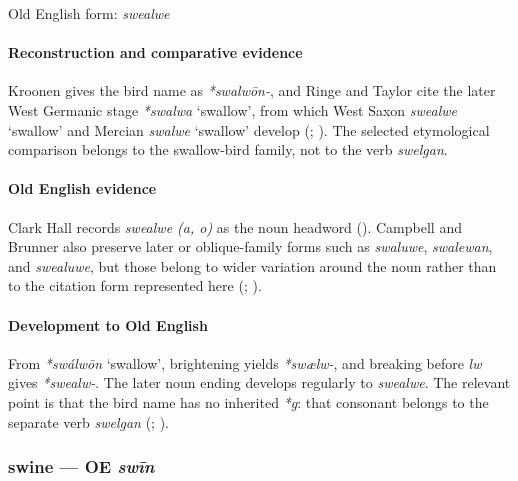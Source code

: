 \documentclass[
  british,
  a4paper,
]{article}
\providecommand{\Recon}[1]{\emph{*#1}}
\begin{document}
Old English form: \emph{swealwe}

\paragraph{Reconstruction and comparative
evidence}\label{reconstruction-and-comparative-evidence-57}

Kroonen gives the bird name as \emph{*swalwōn-}, and Ringe and Taylor
cite the later West Germanic stage \Recon{swalwa} `swallow', from which
West Saxon {\emph{swealwe}} `swallow' and Mercian {\emph{swalwe}}
`swallow' develop (;
). The
selected etymological comparison belongs to the swallow-bird family, not
to the verb \emph{swelgan}.

\paragraph{Old English evidence}\label{old-english-evidence-57}

Clark Hall records \emph{swealwe (a, o)} as the noun headword
(). Campbell and Brunner
also preserve later or oblique-family forms such as \emph{swaluwe},
\emph{swalewan}, and \emph{swealuwe}, but those belong to wider
variation around the noun rather than to the citation form represented
here (;
).

\paragraph{Development to Old
English}\label{development-to-old-english-57}

From \Recon{swálwōn} `swallow', brightening yields \emph{*swælw-}, and
breaking before \emph{lw} gives \emph{*swealw-}. The later noun ending
develops regularly to \emph{swealwe}. The relevant point is that the
bird name has no inherited \emph{*g}: that consonant belongs to the
separate verb \emph{swelgan} (; ).

\subsubsection{\texorpdfstring{swine --- OE
\emph{swīn}}{swine --- OE swīn}}\label{swine-oe-swux12bn}
\end{document}
